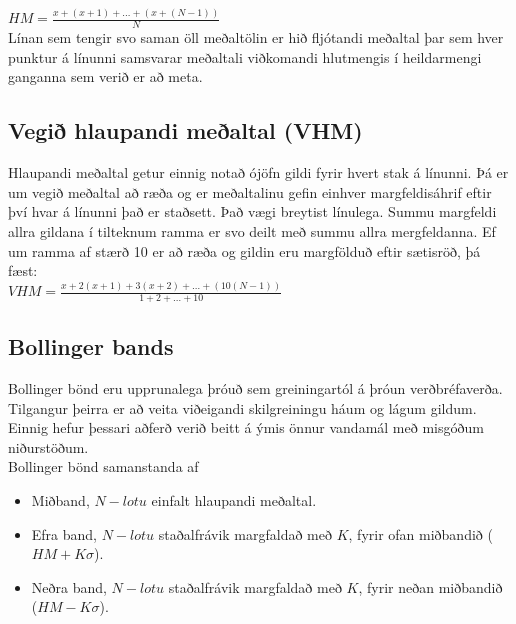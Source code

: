 \documentclass{article}
\begin{document}
$HM = \frac{x+(x+1)+\dots+(x+(N-1))}{N}$
\\
Línan sem tengir svo saman öll meðaltölin er hið
fljótandi meðaltal þar sem hver punktur á línunni
samsvarar 
meðaltali viðkomandi hlutmengis í heildarmengi ganganna
sem verið er að meta. 
 
\subsection{Vegið hlaupandi meðaltal (VHM)}
Hlaupandi meðaltal getur einnig notað ójöfn gildi fyrir
hvert stak á línunni.
Þá er um vegið meðaltal að ræða og er meðaltalinu gefin
einhver margfeldisáhrif eftir því hvar á línunni það er
staðsett. 
Það vægi breytist línulega. Summu margfeldi allra
gildana í tilteknum ramma er svo deilt með summu allra
mergfeldanna. 
Ef um ramma af stærð 10 er að ræða og gildin eru
margfölduð eftir sætisröð, þá fæst: \\
$VHM =
\frac{x+2(x+1)+3(x+2)+\dots+(10(N-1))}{1+2+\dots+10}$
\subsection{Bollinger bands}
\label{sec:third}
Bollinger bönd eru upprunalega þróuð sem greiningartól
á þróun verðbréfaverða. 
Tilgangur þeirra er að veita viðeigandi skilgreiningu
háum og lágum gildum. Einnig hefur þessari aðferð verið
beitt á ýmis önnur
vandamál með misgóðum niðurstöðum. \\
Bollinger bönd samanstanda af
\begin{itemize}
  \item Miðband, $N-lotu$ einfalt hlaupandi meðaltal.
  \item Efra band, $N-lotu$ staðalfrávik margfaldað með
$K$, fyrir ofan miðbandið ($HM + K\sigma$).
  \item Neðra band, $N-lotu$ staðalfrávik margfaldað
með $K$, fyrir neðan miðbandið ($HM -
K\sigma$).%
\end{itemize}
\end{document}
